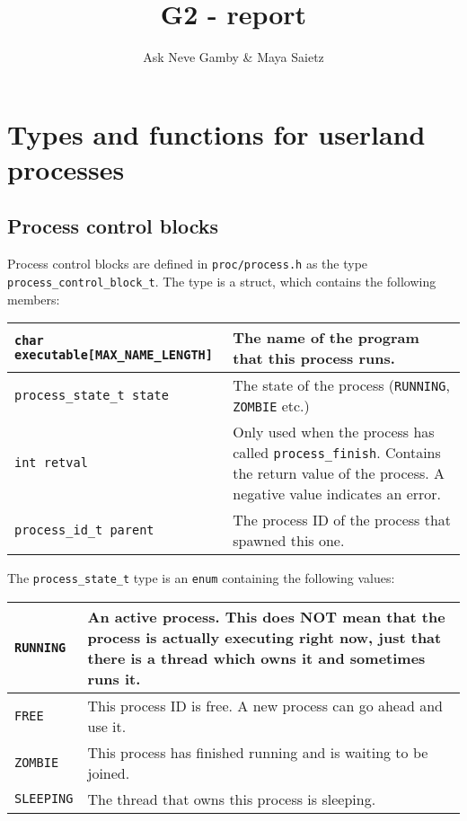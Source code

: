 \documentclass{article}
\title{G2 - report}
\author{Ask Neve Gamby \& Maya Saietz}
\begin{document}
\maketitle
\section{Types and functions for userland processes}

\subsection{Process control blocks}
Process control blocks are defined in \texttt{proc/process.h} as the type \texttt{process\_control\_block\_t}. The type is a struct, which contains the following members:

\begin{tabular}{|p{6cm}|p{6cm}|}
    \hline
    \texttt{char executable[MAX\_NAME\_LENGTH]} & The name of the program that this process runs. \\\hline
               \texttt{process\_state\_t state} & The state of the process (\texttt{RUNNING}, \texttt{ZOMBIE} etc.) \\\hline
                            \texttt{int retval} & Only used when the process has called \texttt{process\_finish}. Contains the return value of the process. A negative value indicates an error. \\\hline
                 \texttt{process\_id\_t parent} & The process ID of the process that spawned this one. \\\hline
\end{tabular}
\vspace{1cm}

The \texttt{process\_state\_t} type is an \texttt{enum} containing the following values:

\begin{tabular}{|p{3cm}|p{9cm}|}
    \hline
    \texttt{RUNNING} & An active process. This does NOT mean that the process is actually executing right now, just that there is a thread which owns it and sometimes runs it. \\\hline
       \texttt{FREE} & This process ID is free. A new process can go ahead and use it. \\\hline
     \texttt{ZOMBIE} & This process has finished running and is waiting to be joined. \\\hline
   \texttt{SLEEPING} & The thread that owns this process is sleeping. \\\hline
\end{tabular}
\end{document}
